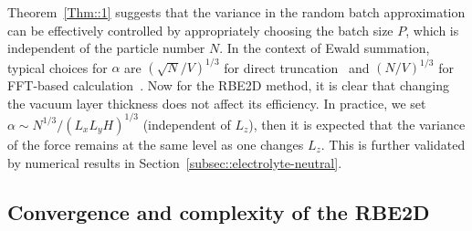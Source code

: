 Theorem~\ref{Thm::1} suggests that the variance in the random batch approximation can be effectively controlled %
by appropriately choosing the batch size $P$, which is independent   {of the} particle number $N$.
In the context of Ewald summation, typical choices for $\alpha$ are $(\sqrt{N}/V)^{1/3}$ for direct truncation~\cite{kolafa1992cutoff} and $(N/V)^{1/3}$ for FFT-based calculation~\cite{deserno1998mesh}. 
Now for the RBE2D method, it is clear that changing the vacuum layer thickness does not affect its efficiency. 
In practice, we set $\alpha\sim N^{1/3}/(L_xL_yH)^{1/3}$ (independent of $L_z$), then it is expected that the variance of the force remains at the same level as one changes $L_z$.
This is further validated by numerical results in Section~\ref{subsec::electrolyte-neutral}.

\subsection{Convergence and complexity of the RBE2D} \label{sec::convergence}

